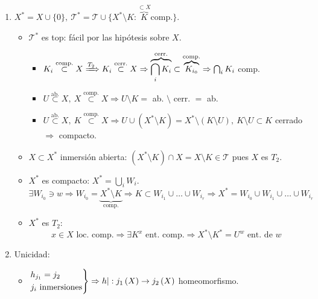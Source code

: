 \begin{demo}
\begin{enumerate}
    \item $X^* = X \cup \{0\},\ \mathcal{T}^* = \mathcal{T} \cup \{X^* \setminus K: \overbrace{K}^{\subset X} \text{comp.}\}$.
    \begin{itemize}
        \item $\mathcal{T}^*$ es top: fácil por las hipótesis sobre $X$.
        \begin{itemize}
            \item $K_i \stackrel{\text{comp.}}{\subset} X \xRightarrow{T_2} K_i \stackrel{\text{cerr.}}{\subset} X \Rightarrow \overbrace{\bigcap_{i} K_i}^{\text{cerr.}} \subset \overbrace{K_{i_0}}^{\text{comp.}} \Rightarrow \bigcap_{i} K_i$ comp.
            \item $U \stackrel{\text{ab.}}{\subset} X,\ X \stackrel{\text{comp.}}{\subset} X \Rightarrow U \setminus K =$ ab. $\setminus$ cerr. $ = $ ab.
            \item $U \stackrel{\text{ab.}}{\subset} X,\ K \stackrel{\text{comp.}}{\subset} X \Rightarrow U \cup \left( X^* \setminus K \right) = X^* \setminus \left( K \setminus U \right),\ K \setminus U \subset K$ cerrado $\Rightarrow$ compacto.
        \end{itemize}
        \item $X \subset X^*$ inmersión abierta: $\left( X^* \setminus K \right) \cap X = X \setminus K \in \mathcal{T}$ pues $X$ es $T_2$.
        \item $X^*$ es compacto: $X^* = \bigcup_{i} W_i$.
        \[
        \exists W_{i_0} \ni w \Rightarrow W_{i_0} = \underbrace{X^* \setminus K}_{\text{comp.}} \Rightarrow K \subset W_{i_1} \cup \ldots \cup W_{i_r} \Rightarrow X^* = W_{i_0} \cup W_{i_1} \cup \ldots \cup W_{i_r}  
        \]
        \item $X^*$ es $T_2:$
        \[
        x \in X \text{ loc. comp.} \Rightarrow \exists K^x \text{ ent. comp.} \Rightarrow X^* \setminus K^* = U^w \text{ ent. de } w
        \]
    \end{itemize}

    \item Unicidad:
    \begin{itemize}
        \item $\begin{rcases}
           h_{j_1} = j_2\\
           j_i \text{ inmersiones} 
        \end{rcases} \Rightarrow h|: j_1\left( X \right) \rightarrow j_2 \left( X \right)$ homeomorfismo.


\end{itemize}
\end{enumerate}
\end{demo}
